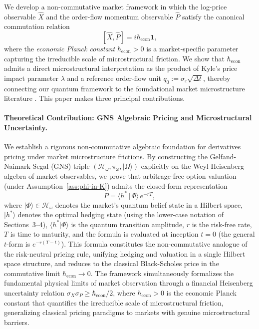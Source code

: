 We develop a non-commutative market framework in which the log-price observable
$\hat{X}$ and the order-flow momentum observable $\hat{P}$ satisfy the canonical
commutation relation
\begin{equation}\label{eq:ccr-intro}
    [\hat{X}, \hat{P}] = i\hbar_{\mathrm{econ}} \mathbf{1},
\end{equation}
where the \emph{economic Planck constant} $\hbar_{\mathrm{econ}} > 0$ is a
market-specific parameter capturing the irreducible scale of microstructural friction.
We show that $\hbar_{\mathrm{econ}}$ admits a direct microstructural interpretation
as the product of Kyle's price impact parameter $\lambda$ and a reference order-flow
unit $q_0 := \sigma_\varepsilon\sqrt{\Delta t}$, thereby connecting our quantum framework to the foundational market
microstructure literature \citep{kyle1985continuous}. This paper makes three principal
contributions.

\paragraph{Theoretical Contribution: GNS Algebraic Pricing and Microstructural
Uncertainty.} We establish a rigorous non-commutative algebraic foundation for
derivatives pricing under market microstructure frictions. By constructing the
Gelfand-Naimark-Segal (GNS) triple $(\mathcal{H}_\omega, \pi_\omega, |\Omega\rangle)$
explicitly on the Weyl-Heisenberg algebra of market observables, we prove that
arbitrage-free option valuation (under Assumption~\ref{ass:phi-in-K}) admits
the closed-form representation
\begin{equation}\label{eq:master-price-intro}
    P = \langle h^* \,|\, \Phi \rangle \, e^{-rT},
\end{equation}
where $|\Phi\rangle \in \mathcal{H}_\omega$ denotes the market's quantum belief state
in a Hilbert space, $|h^*\rangle$ denotes the optimal hedging state (using the
lower-case notation of Sections~3--4), $\langle h^* | \Phi \rangle$ is the quantum
transition amplitude, $r$ is the risk-free rate, $T$ is time to maturity, and the
formula is evaluated at inception $t=0$ (the general $t$-form is $e^{-r(T-t)}$).
This formula constitutes the non-commutative
analogue of the risk-neutral pricing rule, unifying hedging and valuation in a single
Hilbert space structure, and reduces to the classical Black-Scholes price in the
commutative limit $\hbar_{\mathrm{econ}} \to 0$. The framework simultaneously
formalizes the fundamental physical limits of market observation through a financial
Heisenberg uncertainty relation
$\sigma_X \sigma_P \geq \hbar_{\mathrm{econ}}/2$, where
$\hbar_{\mathrm{econ}} > 0$ is the economic Planck constant that quantifies the
irreducible scale of microstructural friction, generalizing classical pricing
paradigms to markets with genuine microstructural barriers.

